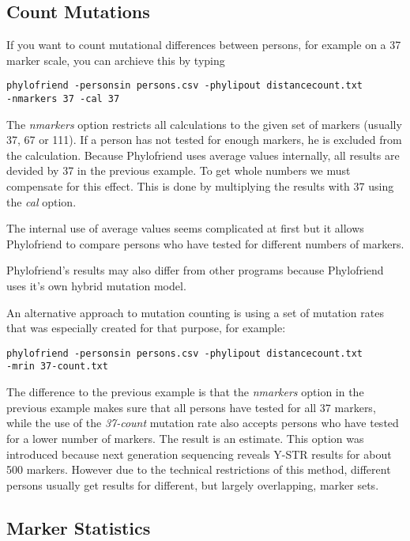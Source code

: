 \subsection{Count Mutations}

If you want to count mutational differences between
persons, for example on a 37 marker scale, you can
archieve this by typing

\noindent\texttt{phylofriend -personsin persons.csv -phylipout distancecount.txt\\
-nmarkers 37 -cal 37}

The \emph{nmarkers} option restricts all calculations
to the given set of markers (usually 37, 67 or 111). If
a person has not tested for enough markers, he is excluded
from the calculation. Because Phylofriend uses average
values internally, all results are devided by 37 in 
the previous example. To get whole numbers we must compensate
for this effect. This is done by multiplying the results
with 37 using the \emph{cal} option.

The internal use of average values seems complicated at
first but it allows Phylofriend to compare persons who
have tested for different numbers of markers.

Phylofriend's results may also differ from other programs
because Phylo\-friend uses it's own hybrid mutation model.

An alternative approach to mutation counting is using a set
of mutation rates that was especially created for that purpose,
for example:

\noindent\texttt{phylofriend -personsin persons.csv -phylipout distancecount.txt\\
-mrin 37-count.txt}

The difference to the previous example is that the \emph{nmarkers}
option in the previous example makes sure that all persons
have tested for all 37 markers, while the use of the
\emph{37-count} mutation rate also accepts persons who have
tested for a lower number of markers. The result is an estimate.
This option was introduced because next generation sequencing
reveals Y-STR results for about 500 markers. However due to
the technical restrictions of this method, different persons
usually get results for different, but largely overlapping,
marker sets.


\subsection{Marker Statistics}

